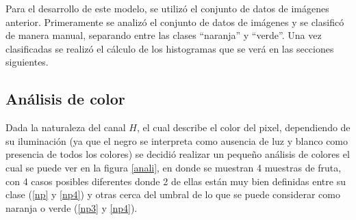 \documentclass[twoside,spanish,ESP,MSc]{plantillaLabUPV}
\theoremstyle{definition}
\begin{document}
Para el desarrollo de este modelo, se utilizó el conjunto de datos de imágenes anterior. Primeramente se analizó el conjunto de datos de imágenes y se clasificó de manera manual, separando entre las clases ``naranja'' y ``verde''. Una vez clasificadas se realizó el cálculo de los histogramas que se verá en las secciones siguientes.


\subsection{Análisis de color}

Dada la naturaleza del canal $H$, el cual describe el color del pixel, dependiendo de su iluminación (ya que el negro se interpreta como ausencia de luz y blanco como presencia de todos los colores) se decidió realizar un pequeño análisis de colores el cual se puede ver en la figura \ref{anali}, en donde se muestran 4 muestras de fruta, con 4 casos posibles diferentes donde 2 de ellas están muy bien definidas entre su clase (\ref{np} y \ref{np4}) y otras cerca del umbral de lo que se puede considerar como naranja o verde (\ref{np3} y \ref{np4}).
\end{document}
